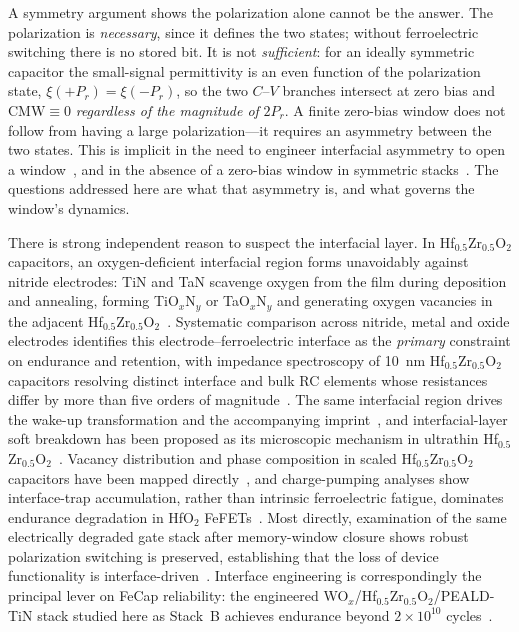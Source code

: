 \documentclass[journal]{IEEEtran}
\newcommand{\hzo}{Hf$_{0.5}$Zr$_{0.5}$O$_{2}$}
\newcommand{\CMW}{\mathrm{CMW}}
\begin{document}
A symmetry argument shows the polarization alone cannot be the answer. The
polarization is \emph{necessary}, since it defines the two states; without
ferroelectric switching there is no stored bit. It is not \emph{sufficient}:
for an ideally symmetric capacitor the small-signal permittivity is an even
function of the polarization state, $\xi(+P_r) = \xi(-P_r)$, so the two
$C$--$V$ branches intersect at zero bias and $\CMW \equiv 0$
\emph{regardless of the magnitude of} $2P_r$. A finite zero-bias window does
not follow from having a large polarization---it requires an asymmetry
between the two states. This is implicit in the need to engineer interfacial
asymmetry to open a window~\cite{mukherjee2023edl,mukherjee2023iedm}, and in
the absence of a zero-bias window in symmetric stacks~\cite{lee2025aem}. The
questions addressed here are what that asymmetry is, and what governs the
window's dynamics.

There is strong independent reason to suspect the interfacial layer. In \hzo{}
capacitors, an oxygen-deficient interfacial region forms unavoidably against
nitride electrodes: TiN and TaN scavenge oxygen from the film during
deposition and annealing, forming TiO$_x$N$_y$ or TaO$_x$N$_y$ and generating
oxygen vacancies in the adjacent
\hzo{}~\cite{kim2023vacancy,segantini2023strain,koroleva2022}. Systematic
comparison across nitride, metal and oxide electrodes identifies this
electrode--ferroelectric interface as the \emph{primary} constraint on
endurance and retention, with impedance spectroscopy of 10~nm \hzo{}
capacitors resolving distinct interface and bulk RC elements whose
resistances differ by more than five orders of
magnitude~\cite{alcala2023}. The same interfacial region drives the wake-up
transformation and the accompanying
imprint~\cite{pesic2016,schenk2014,grimley2016,schenk2014apr,li2024imprint},
and interfacial-layer soft breakdown has been proposed as its microscopic
mechanism in ultrathin \hzo{}~\cite{cho2024wakeup,de2024tradeoff}. Vacancy
distribution and phase composition in scaled \hzo{} capacitors have been
mapped directly~\cite{iung2025,kumar2025review}, and charge-pumping analyses
show interface-trap accumulation, rather than intrinsic ferroelectric
fatigue, dominates endurance degradation in HfO$_2$
FeFETs~\cite{rana2025cp,raffel2025,senapati2025}. Most directly, examination
of the same electrically degraded gate stack after memory-window closure
shows robust polarization switching is preserved, establishing that the loss
of device functionality is
interface-driven~\cite{das2026paradox,das2025sisc}. Interface engineering is
correspondingly the principal lever on FeCap reliability: the engineered
WO$_x$/\hzo{}/PEALD-TiN stack studied here as Stack~B achieves endurance
beyond $2\times10^{10}$ cycles~\cite{paul2026wox}.
\end{document}
